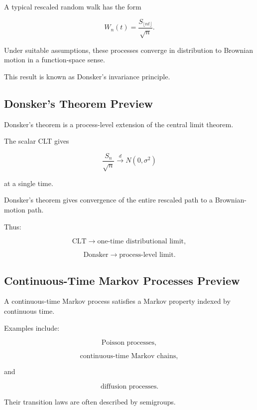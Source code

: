 A typical rescaled random walk has the form

\[
\boxed{
W_n(t)
=
\frac{
S_{\lfloor nt\rfloor}
}{
\sqrt{n}
}.
}
\]

Under suitable assumptions, these processes converge in distribution to
Brownian motion in a function-space sense.

This result is known as Donsker's invariance principle.

\subsection{Donsker's Theorem Preview}
\label{subsec:donsker-preview}

Donsker's theorem is a process-level extension of the central limit
theorem.

The scalar CLT gives

\[
\frac{S_n}{\sqrt{n}}
\xrightarrow{d}
N(0,\sigma^2)
\]

at a single time.

Donsker's theorem gives convergence of the entire rescaled path to a
Brownian-motion path.

Thus:

\[
\boxed{
\text{CLT}
\longrightarrow
\text{one-time distributional limit},
}
\]

\[
\boxed{
\text{Donsker}
\longrightarrow
\text{process-level limit}.
}
\]

\subsection{Continuous-Time Markov Processes Preview}
\label{subsec:continuous-time-markov-preview}

A continuous-time Markov process satisfies a Markov property indexed by
continuous time.

Examples include:

\[
\boxed{
\text{Poisson processes},
}
\]

\[
\boxed{
\text{continuous-time Markov chains},
}
\]

and

\[
\boxed{
\text{diffusion processes}.
}
\]

Their transition laws are often described by semigroups.

